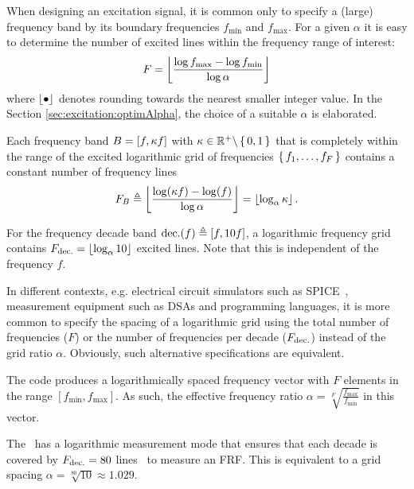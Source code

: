   When designing an excitation signal, it is common only to specify a (large) frequency band by its boundary frequencies $f_{\min}$ and $f_{\max}$.
  For a given $\alpha$ it is easy to determine the number of excited lines within the frequency range of interest:
    \begin{equation}
      F = \left\lfloor 
                  \frac{\log{f_{\max}} - \log{f_{\min}}}
                       {\log{\alpha}}
                 \right\rfloor
    \label{eq:excitation:logms:F}
    \end{equation}
  where $\left\lfloor \bullet \right\rfloor$ denotes rounding towards the nearest smaller integer value.
  In the Section \ref{sec:excitation:optimAlpha}, the choice of a suitable $\alpha$ is elaborated.

  \begin{property}\label{prop:excitation:log:relBW}
   Each frequency band $B = \left[ f, \kappa f \right]$ with $\kappa \in {\ensuremath{\mathbb{R}}}^{+} \backslash \set{0,1}$ that is completely within the range of the excited logarithmic grid of frequencies $\set{f_1, \ldots, f_F}$ contains a constant number of frequency lines
   \begin{equation}
     F_{B} \triangleq
     \left\lfloor \frac{\log (\kappa f) - \log( f )}{\log \alpha} \right\rfloor
         = \left\lfloor \log_{\alpha} \kappa \right\rfloor
         \text{.}
   \end{equation}
   \end{property}
  \begin{example}
    For the frequency decade band $\mathrm{dec.}(f) \triangleq \left[ f, 10 f \right]$, a logarithmic frequency grid contains $F_{\mathrm{dec.}} = \left\lfloor \log_{\alpha} 10 \right\rfloor$ excited lines.
    Note that this is independent of the frequency $f$.
  \end{example}
  \begin{remark}
    In different contexts, e.g. electrical circuit simulators such as \gls{SPICE}~\citep{Kundert1995}, measurement equipment such as \glspl{DSA} and programming languages, it is more common to specify the spacing of a logarithmic grid using the total number of frequencies ($F$) or the number of frequencies per decade ($F_{\mathrm{dec.}}$) instead of the grid ratio $\alpha$.
    Obviously, such alternative specifications are equivalent.
  \end{remark}
  \begin{example} \label{eg:excitation:logarithmicGrid:matlab}
    The \MATLAB code  produces a logarithmically spaced frequency vector  with $F$ elements in the range $\left[ f_{\min}, f_{\max} \right]$.
    As such, the effective frequency ratio $\alpha = \sqrt[F]{\frac{f_{\max}}{f_{\min}}}$ in this vector.
  \end{example}
  \begin{example}
    The~\citet{HP3562A} has a logarithmic measurement mode that ensures that each decade is covered by $F_{\mathrm{dec.}} = 80$ lines~ to measure an \gls{FRF}.
    This is equivalent to a grid spacing $\alpha = \sqrt[80]{10} \approx 1.029$.
  \end{example}


